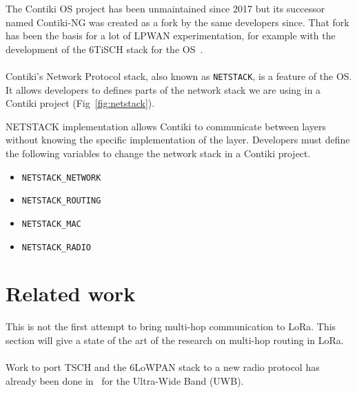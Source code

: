 The Contiki OS project has been unmaintained since 2017 but its
successor named Contiki-NG was created as a fork by the same developers since.
That fork has been the basis for a lot of LPWAN experimentation, for example 
with the development of the 6TiSCH stack for the OS~\cite{Duquennoy2017TSCHA6}.

\paragraph{}

Contiki's Network Protocol stack, also known as \lstinline{NETSTACK}, is a
feature of the OS.
It allows developers to defines parts of the network stack we are using in a Contiki
project (Fig~\ref{fig:netstack}).

NETSTACK implementation allows Contiki to communicate between layers without 
knowing the specific implementation of the layer.
Developers must define the following variables to change the network stack 
in a Contiki project.

\begin{itemize}
  \item \lstinline{NETSTACK_NETWORK}
  \item \lstinline{NETSTACK_ROUTING}
  \item \lstinline{NETSTACK_MAC}
  \item \lstinline{NETSTACK_RADIO}
\end{itemize}



\section{Related work}

This is not the first attempt to bring multi-hop communication to LoRa.
This section will give a state of the art of the research on
multi-hop routing in LoRa.

\paragraph{}

Work to port TSCH and the 6LoWPAN stack to a new radio protocol has already 
been done in~\cite{uwbtsch} for the Ultra-Wide Band (UWB).


